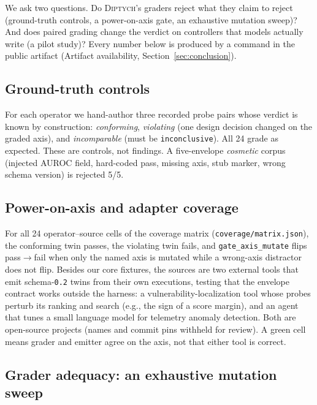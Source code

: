 \documentclass[sigconf,review,anonymous]{acmart}
\newcommand{\sys}{\textsc{Diptych}}
\begin{document}
	We ask two questions. Do \sys{}'s graders reject what they claim to reject
	(ground-truth controls, a power-on-axis gate, an exhaustive mutation
	sweep)? And does paired grading change the verdict on controllers that
	models actually write (a pilot study)? Every number below is produced by a
	command in the public artifact (Artifact availability,
	Section~\ref{sec:conclusion}).
	
	\subsection{Ground-truth controls}
	
	For each operator we hand-author three recorded probe pairs whose verdict
	is known by construction: \emph{conforming}, \emph{violating} (one design
	decision changed on the graded axis), and \emph{incomparable} (must be
	\texttt{inconclusive}). All 24 grade as expected. These are controls, not
	findings. A five-envelope \emph{cosmetic} corpus (injected AUROC field,
	hard-coded pass, missing axis, stub marker, wrong schema version) is
	rejected 5/5.
	
	\subsection{Power-on-axis and adapter coverage}
	\label{sec:adapters}
	
	For all 24 operator--source cells of the coverage matrix
	(\texttt{coverage/matrix.json}), the conforming twin passes, the violating
	twin fails, and \texttt{gate\_axis\_mutate} flips pass$\to$fail when only the named axis
	is mutated while a wrong-axis distractor does not flip. Besides our core
	fixtures, the sources are two external tools that emit
	schema-\texttt{0.2} twins from their own executions, testing that the
	envelope contract works outside the harness: a
	vulnerability-localization tool whose probes perturb its ranking and
	search (e.g., the sign of a score margin), and an agent that tunes a
	small language model for telemetry anomaly detection. Both are
	open-source projects (names and commit pins withheld for review). A green cell means grader and emitter agree on the
	axis, not that either tool is correct.
	
	
	
	\subsection{Grader adequacy: an exhaustive mutation sweep}
	\label{sec:eval-adequacy}
	
\end{document}
